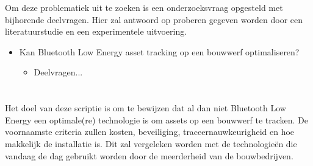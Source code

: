 
Om deze problematiek uit te zoeken is een onderzoeksvraag opgesteld met bijhorende deelvragen. Hier zal antwoord op proberen gegeven worden door een literatuurstudie en een experimentele uitvoering.

\begin{itemize}
    \item Kan Bluetooth Low Energy asset tracking op een bouwwerf optimaliseren?
    \begin{itemize}
        \item Deelvragen...
    \end{itemize}
\end{itemize}

\section{}%
\label{sec:onderzoeksdoelstelling}


Het doel van deze scriptie is om te bewijzen dat al dan niet Bluetooth Low Energy een optimale(re) technologie is om assets op een bouwwerf te tracken. De voornaamste criteria zullen kosten, beveiliging, traceernauwkeurigheid en hoe makkelijk de installatie is. Dit zal vergeleken worden met de technologieën die vandaag de dag gebruikt worden door de meerderheid van de bouwbedrijven.

\section{}%
\label{sec:opzet-bachelorproef}


